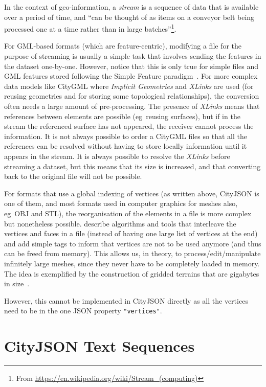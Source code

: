 \documentclass{isprs} %
\newcommand{\eg}{eg}
\begin{document}
In the context of geo-information, a \emph{stream} is a sequence of data that is available over a period of time, and ``can be thought of as items on a conveyor belt being processed one at a time rather than in large batches''\footnote{From \url{https://en.wikipedia.org/wiki/Stream_(computing)}}.

%

For GML-based formats (which are feature-centric), modifying a file for the purpose of streaming is usually a simple task that involves sending the features in the dataset one-by-one.
However, notice that this is only true for simple files and GML features stored following the Simple Feature paradigm~\citep{OGC-SF}.
For more complex data models like CityGML where \emph{Implicit Geometries} and \emph{XLinks} are used (for reusing geometries and for storing some topological relationships), the conversion often needs a large amount of pre-processing.
The presence of \emph{XLinks} means that references between elements are possible (\eg\ reusing surfaces), but if in the stream the referenced surface has not appeared, the receiver cannot process the information.
It is not always possible to order a CityGML files so that all the references can be resolved without having to store locally information until it appears in the stream.
It is always possible to resolve the \emph{XLinks} before streaming a dataset, but this means that its size is increased, and that converting back to the original file will not be possible.


%

For formats that use a global indexing of vertices (as written above, CityJSON is one of them, and  most formats used in computer graphics for meshes also, \eg\ OBJ and STL), the reorganisation of the elements in a file is more complex but nonetheless possible.
\citet{Isenburg03} describe algorithms and tools that interleave the vertices and faces in a file (instead of having one large list of vertices at the end) and add simple tags to inform that vertices are not to be used anymore (and thus can be freed from memory).
This allows us, in theory, to process/edit/manipulate infinitely large meshes, since they never have to be completely loaded in memory.
The idea is exemplified by the construction of gridded terrains that are gigabytes in size~\citep{Isenburg06-1}.

However, this cannot be implemented in CityJSON directly as all the vertices need to be in the one JSON property \texttt{"vertices"}.


%
\section{CityJSON Text Sequences}%
\label{sec:cityjsonseq}
\end{document}
